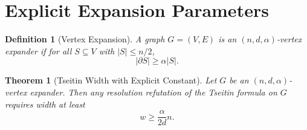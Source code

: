 \documentclass{article}
\newtheorem{definition}{Definition}
\newtheorem{theorem}{Theorem}
\begin{document}
\section{Explicit Expansion Parameters}

\begin{definition}[Vertex Expansion]
A graph $G=(V,E)$ is an $(n,d,\alpha)$-vertex expander if
for all $S \subseteq V$ with $|S|\le n/2$,
\[
|\partial S| \ge \alpha |S|.
\]
\end{definition}

\begin{theorem}[Tseitin Width with Explicit Constant]
Let $G$ be an $(n,d,\alpha)$-vertex expander.
Then any resolution refutation of the Tseitin formula
on $G$ requires width at least
\[
w \ge \frac{\alpha}{2d} n.
\]
\end{theorem}
\end{document}
